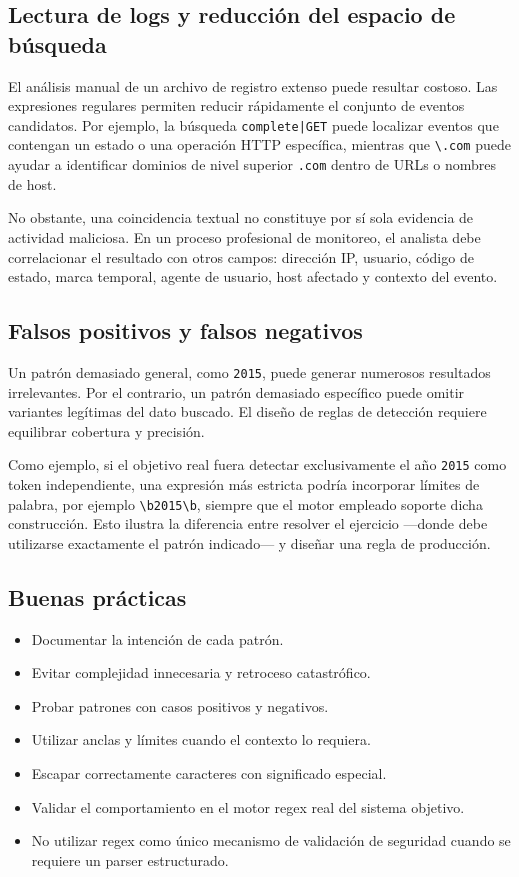 \documentclass[11pt,a4paper]{article}
\newcommand{\regex}[1]{\texttt{#1}}
\begin{document}
\subsection{Lectura de logs y reducción del espacio de búsqueda}
El análisis manual de un archivo de registro extenso puede resultar costoso. Las expresiones regulares permiten reducir rápidamente el conjunto de eventos candidatos. Por ejemplo, la búsqueda \regex{complete|GET} puede localizar eventos que contengan un estado o una operación HTTP específica, mientras que \regex{\textbackslash .com} puede ayudar a identificar dominios de nivel superior \texttt{.com} dentro de URLs o nombres de host.

No obstante, una coincidencia textual no constituye por sí sola evidencia de actividad maliciosa. En un proceso profesional de monitoreo, el analista debe correlacionar el resultado con otros campos: dirección IP, usuario, código de estado, marca temporal, agente de usuario, host afectado y contexto del evento.

\subsection{Falsos positivos y falsos negativos}
Un patrón demasiado general, como \regex{2015}, puede generar numerosos resultados irrelevantes. Por el contrario, un patrón demasiado específico puede omitir variantes legítimas del dato buscado. El diseño de reglas de detección requiere equilibrar cobertura y precisión.

Como ejemplo, si el objetivo real fuera detectar exclusivamente el año \texttt{2015} como token independiente, una expresión más estricta podría incorporar límites de palabra, por ejemplo \regex{\textbackslash b2015\textbackslash b}, siempre que el motor empleado soporte dicha construcción. Esto ilustra la diferencia entre resolver el ejercicio ---donde debe utilizarse exactamente el patrón indicado--- y diseñar una regla de producción.

\subsection{Buenas prácticas}
\begin{itemize}
    \item Documentar la intención de cada patrón.
    \item Evitar complejidad innecesaria y retroceso catastrófico.
    \item Probar patrones con casos positivos y negativos.
    \item Utilizar anclas y límites cuando el contexto lo requiera.
    \item Escapar correctamente caracteres con significado especial.
    \item Validar el comportamiento en el motor regex real del sistema objetivo.
    \item No utilizar regex como único mecanismo de validación de seguridad cuando se requiere un parser estructurado.
\end{itemize}
\end{document}
